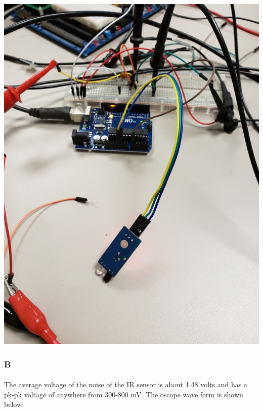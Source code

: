 \documentclass[12pt]{article}
\begin{document}
					\begin{center}
						\includegraphics[scale=0.05]{ir.jpg}\\
					\end{center}
			
			\subsubsection{B}
				\paragraph{}
					The average voltage of the noise of the IR sensor is about 1.48 volts and has a pk-pk voltage of anywhere from 300-800 mV.  The oscope wave
					form is shown below
\end{document}
